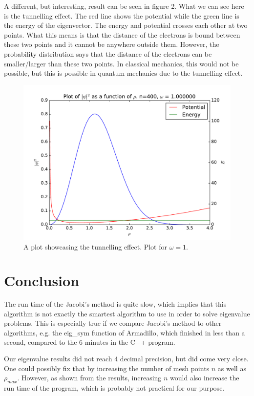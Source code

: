 \documentclass[12pt]{article}
\begin{document}
A different, but interesting, result can be seen in figure 2. What we can see here is the tunnelling effect. The red line shows the potential while the green line is the energy of the eigenvector. The energy and potential crosses each other at two points. What this means is that the distance of the electrons is bound between these two points and it cannot be anywhere outside them. However, the probability distribution says that the distance of the electrons can be smaller/larger than these two points. In classical mechanics, this would not be possible, but this is possible in quantum mechanics due to the tunnelling effect.

\begin{figure}[hbtp]
\centering
\includegraphics[width=\linewidth]{Plots/Plot_groundstate_tunneling_effect.pdf}
\caption{A plot showcasing the tunnelling effect. Plot for $\omega = 1$.}
\end{figure}


\section{Conclusion}
The run time of the Jacobi's method is quite slow, which implies that this algorithm is not exactly the smartest algorithm to use in order to solve eigenvalue problems. This is especially true if we compare Jacobi's method to other algorithms, e.g. the eig\_sym function of Armadillo, which finished in less than a second, compared to the 6 minutes in the C++ program.

Our eigenvalue results did not reach 4 decimal precision, but did come very close. One could possibly fix that by increasing the number of mesh points $n$ as well as $\rho_{max}$. However, as shown from the results, increasing $n$ would also increase the run time of the program, which is probably not practical for our purpose.
\end{document}
